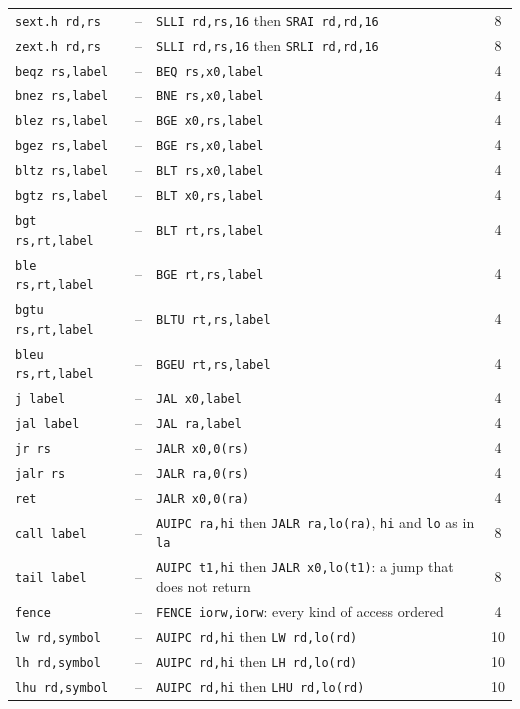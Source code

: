 \documentclass[11pt,a4paper]{report}
\begin{document}
\begin{footnotesize}
\begin{longtable}{@{}>{\raggedright\arraybackslash}p{3.3cm}c
    >{\raggedright\arraybackslash}p{8.4cm}c@{}}
  \texttt{sext.h rd,rs} & -- & \texttt{SLLI rd,rs,16} then \texttt{SRAI rd,rd,16} & 8 \\
  \texttt{zext.h rd,rs} & -- & \texttt{SLLI rd,rs,16} then \texttt{SRLI rd,rd,16} & 8 \\
  \texttt{beqz rs,label} & -- & \texttt{BEQ rs,x0,label} & 4 \\
  \texttt{bnez rs,label} & -- & \texttt{BNE rs,x0,label} & 4 \\
  \texttt{blez rs,label} & -- & \texttt{BGE x0,rs,label} & 4 \\
  \texttt{bgez rs,label} & -- & \texttt{BGE rs,x0,label} & 4 \\
  \texttt{bltz rs,label} & -- & \texttt{BLT rs,x0,label} & 4 \\
  \texttt{bgtz rs,label} & -- & \texttt{BLT x0,rs,label} & 4 \\
  \texttt{bgt rs,rt,label} & -- & \texttt{BLT rt,rs,label} & 4 \\
  \texttt{ble rs,rt,label} & -- & \texttt{BGE rt,rs,label} & 4 \\
  \texttt{bgtu rs,rt,label} & -- & \texttt{BLTU rt,rs,label} & 4 \\
  \texttt{bleu rs,rt,label} & -- & \texttt{BGEU rt,rs,label} & 4 \\
  \texttt{j label} & -- & \texttt{JAL x0,label} & 4 \\
  \texttt{jal label} & -- & \texttt{JAL ra,label} & 4 \\
  \texttt{jr rs} & -- & \texttt{JALR x0,0(rs)} & 4 \\
  \texttt{jalr rs} & -- & \texttt{JALR ra,0(rs)} & 4 \\
  \texttt{ret} & -- & \texttt{JALR x0,0(ra)} & 4 \\
  \texttt{call label} & -- & \texttt{AUIPC ra,hi} then \texttt{JALR ra,lo(ra)}, \texttt{hi}
    and \texttt{lo} as in \texttt{la} & 8 \\
  \texttt{tail label} & -- & \texttt{AUIPC t1,hi} then \texttt{JALR x0,lo(t1)}: a jump that
    does not return & 8 \\
  \texttt{fence} & -- & \texttt{FENCE iorw,iorw}: every kind of access ordered & 4 \\
  \texttt{lw rd,symbol} & -- & \texttt{AUIPC rd,hi} then \texttt{LW rd,lo(rd)} & 10 \\
  \texttt{lh rd,symbol} & -- & \texttt{AUIPC rd,hi} then \texttt{LH rd,lo(rd)} & 10 \\
  \texttt{lhu rd,symbol} & -- & \texttt{AUIPC rd,hi} then \texttt{LHU rd,lo(rd)} & 10 \\

\end{longtable}
\end{footnotesize}
\end{document}
